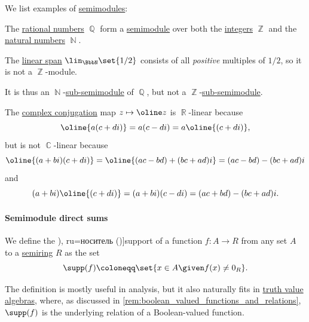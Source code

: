 \begin{example}\label{ex:def:semimodule}
  We list examples of \hyperref[def:semimodule]{semimodules}:
  \begin{thmenum}
     The \hyperref[def:rational_numbers]{rational numbers} \( \BbbQ \) form a \hyperref[def:semimodule]{semimodule} over both the \hyperref[def:integers]{integers} \( \BbbZ \) and the \hyperref[def:natural_numbers]{natural numbers} \( \BbbN \).

    The \hyperref[def:linear_span]{linear span} \( \lin_\BbbN \set{ 1 / 2 } \) consists of all \emph{positive} multiples of \( 1 / 2 \), so it is not a \( \BbbZ \)-module.

    It is thus an \( \BbbN \)-\hyperref[def:semimodule/subobject]{sub-semimodule} of \( \BbbQ \), but not a \( \BbbZ \)-\hyperref[def:semimodule/subobject]{sub-semimodule}.

     The \hyperref[def:complex_conjugation]{complex conjugation} map \( z \mapsto \oline z \) is \( \BbbR \)-linear because
    \begin{equation*}
      \oline{a(c + di)} = a(c - di) = a\oline{(c + di)},
    \end{equation*}
    but is not \( \BbbC \)-linear because
    \begin{equation*}
      \oline{(a + bi)(c + di)} = \oline{(ac - bd) + (bc + ad)i} = (ac - bd) - (bc + ad)i
    \end{equation*}
    and
    \begin{equation*}
      (a + bi)\oline{(c + di)} =(a + bi)(c - di) = (ac + bd) - (bc + ad)i.
    \end{equation*}
  \end{thmenum}
\end{example}

\paragraph{Semimodule direct sums}

\begin{definition}\label{def:function_support}
  We define the \term[bg=носител (\cite[58]{Боянов2008ЧислениМетоди}), ru=носитель (\cite[46]{Мальцев1970АлгебраическиеСистемы})]{support} of a function \( f: A \to R \) from any set \( A \) to a \hyperref[def:semiring]{semiring} \( R \) as the set
  \begin{equation*}
    \supp(f) \coloneqq \set{ x \in A \given f(x) \neq 0_R }.
  \end{equation*}
\end{definition}
\begin{comments}
  \item The definition is mostly useful in analysis, but it also naturally fits in \hyperref[def:truth_value_algebra]{truth value algebras}, where, as discussed in \cref{rem:boolean_valued_functions_and_relations}, \( \supp(f) \) is the underlying relation of a Boolean-valued function.
\end{comments}

